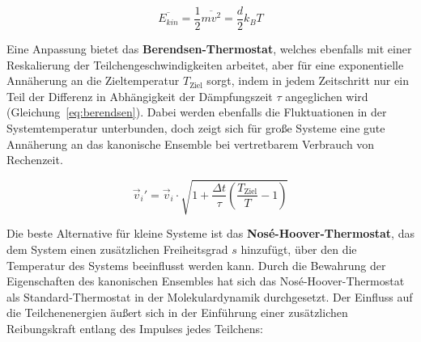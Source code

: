 \begin{equation}
  \overline{E_{kin}} = \frac{1}{2} \overline{m v^2} = \frac{d}{2} k_B T
  \label{eq:ekanonisch}
\end{equation}

Eine Anpassung bietet das \textbf{Berendsen-Thermostat}\cite{berendsen_molecular_1984}, welches ebenfalls mit einer Reskalierung der Teilchengeschwindigkeiten arbeitet, aber für eine exponentielle Annäherung an die Zieltemperatur $T_\text{Ziel}$ sorgt, indem in jedem Zeitschritt nur ein Teil der Differenz in Abhängigkeit der Dämpfungszeit $\tau$ angeglichen wird (Gleichung~\ref{eq:berendsen}).
Dabei werden ebenfalls die Fluktuationen in der Systemtemperatur unterbunden, doch zeigt sich für große Systeme eine gute Annäherung an das kanonische Ensemble bei vertretbarem Verbrauch von Rechenzeit.

\begin{equation}
  \vec v_i' = \vec v_i \cdot \sqrt{1 + \frac{\Delta t}{\tau} \left(\frac{T_\text{Ziel}}{T} - 1\right)}
  \label{eq:berendsen}
\end{equation}


Die beste Alternative für kleine Systeme ist das \textbf{Nosé-Hoover-Thermostat}\cite{nose_unified_1984}\cite{hoover_canonical_1985}, das dem System einen zusätzlichen Freiheitsgrad $s$ hinzufügt, über den die Temperatur des Systems beeinflusst werden kann.
Durch die Bewahrung der Eigenschaften des kanonischen Ensembles hat sich das Nosé-Hoover-Thermostat als Standard-Thermostat in der Molekulardynamik durchgesetzt.
Der Einfluss auf die Teilchenenergien äußert sich in der Einführung einer zusätzlichen Reibungskraft entlang des Impulses jedes Teilchens:

